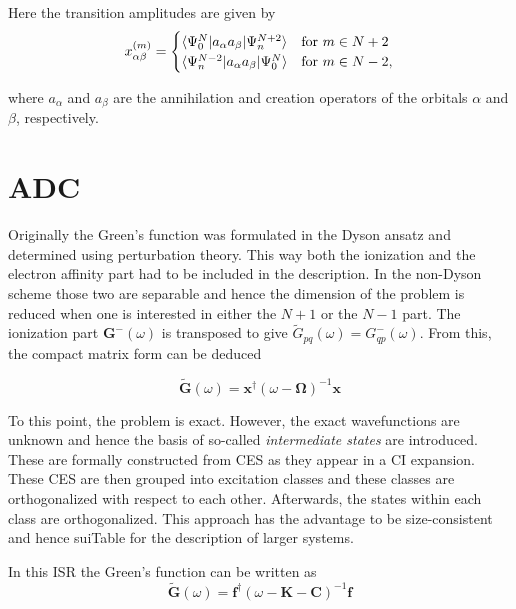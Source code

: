 Here the transition amplitudes are given by
\begin{equation}
x^{(m)}_{\alpha\beta}=\begin{cases}
\braket{\Psi_0^N|a_\alpha a_\beta|\Psi_n^{N+2}} & \text{for } m\in N+2\\
\braket{\Psi_n^{N-2}|a_\alpha a_\beta|\Psi_0^{N}} & \text{for } m\in N-2,
\end{cases}
\end{equation}

where $a_\alpha$ and $a_\beta$ are the annihilation and creation operators of
the orbitals $\alpha$ and $\beta$, respectively.



\section{\acl{ADC}}
Originally the Green's function was formulated in the Dyson ansatz and
determined using perturbation theory. This way both the ionization and the
electron affinity part had to be included in the description. In the non-Dyson
scheme those two are separable and hence the dimension of the problem is reduced
when one is interested in either the $N+1$ or the $N-1$ part. \cite{Schirmer98}
The ionization part $\mathbf{G^-}(\omega)$ is transposed to give
$\tilde{G}_{pq}(\omega) = G^-_{qp}(\omega)$. From this, the compact matrix
form can be deduced

\begin{equation}\label{matrixspec}
\mathbf{\tilde{G}}(\omega) = \mathbf{x}^\dagger(\omega-\mathbf{\Omega})^{-1}\mathbf{x}
\end{equation}

To this point, the problem is exact. However, the exact wavefunctions are unknown
and hence the basis of so-called \emph{intermediate states} are introduced. These
are formally constructed from \ac{CES} as they appear in a
\ac{CI} expansion. These \ac{CES} are then grouped into excitation classes
and these classes are orthogonalized with respect to each other. Afterwards,
the states within each class are orthogonalized. 
This approach has the advantage to be size-consistent and hence
suiTable for the description of larger systems. \cite{Mertins96_1}

In this \ac{ISR} the Green's function can be written as
\begin{equation}\label{isradc}
\mathbf{\tilde{G}}(\omega) = \mathbf{f}^\dagger(\omega-\mathbf{K}-\mathbf{C})^{-1}\mathbf{f}
\end{equation}

